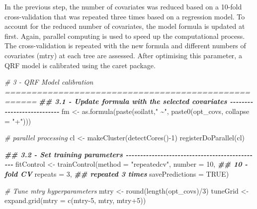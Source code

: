 \documentclass[
  10pt,
  b5paper,
  oneside]{book}
\newenvironment{Shaded}{\begin{snugshade}}{\end{snugshade}}
\newcommand{\AttributeTok}[1]{\textcolor[rgb]{0.77,0.63,0.00}{#1}}
\newcommand{\CommentTok}[1]{\textcolor[rgb]{0.56,0.35,0.01}{\textit{#1}}}
\newcommand{\ConstantTok}[1]{\textcolor[rgb]{0.00,0.00,0.00}{#1}}
\newcommand{\DecValTok}[1]{\textcolor[rgb]{0.00,0.00,0.81}{#1}}
\newcommand{\DocumentationTok}[1]{\textcolor[rgb]{0.56,0.35,0.01}{\textbf{\textit{#1}}}}
\newcommand{\FunctionTok}[1]{\textcolor[rgb]{0.00,0.00,0.00}{#1}}
\newcommand{\NormalTok}[1]{#1}
\newcommand{\OtherTok}[1]{\textcolor[rgb]{0.56,0.35,0.01}{#1}}
\newcommand{\SpecialCharTok}[1]{\textcolor[rgb]{0.00,0.00,0.00}{#1}}
\newcommand{\StringTok}[1]{\textcolor[rgb]{0.31,0.60,0.02}{#1}}
\begin{document}
In the previous step, the number of covariates was reduced based on a 10-fold cross-validation that was repeated three times based on a regression model. To account for the reduced number of covariates, the model formula is updated at first.
Again, parallel computing is used to speed up the computational process.
The cross-validation is repeated with the new formula and different numbers of covariates (mtry) at each tree are assessed. After optimising this parameter, a QRF model is calibrated using the caret package.

\begin{Shaded}
\begin{Highlighting}[]
\CommentTok{\# 3 {-} QRF Model calibration ====================================================}
\DocumentationTok{\#\# 3.1 {-} Update formula with the selected covariates {-}{-}{-}{-}{-}{-}{-}{-}{-}{-}{-}{-}{-}{-}{-}{-}{-}{-}{-}{-}{-}{-}{-}{-}{-}{-}{-}}
\NormalTok{fm }\OtherTok{\textless{}{-}} \FunctionTok{as.formula}\NormalTok{(}\FunctionTok{paste}\NormalTok{(soilatt,}\StringTok{" \textasciitilde{}"}\NormalTok{, }\FunctionTok{paste0}\NormalTok{(opt\_covs, }\AttributeTok{collapse =} \StringTok{"+"}\NormalTok{)))}

\CommentTok{\# parallel processing}
\NormalTok{cl }\OtherTok{\textless{}{-}} \FunctionTok{makeCluster}\NormalTok{(}\FunctionTok{detectCores}\NormalTok{()}\SpecialCharTok{{-}}\DecValTok{1}\NormalTok{)}
\FunctionTok{registerDoParallel}\NormalTok{(cl)}

\DocumentationTok{\#\# 3.2 {-} Set training parameters {-}{-}{-}{-}{-}{-}{-}{-}{-}{-}{-}{-}{-}{-}{-}{-}{-}{-}{-}{-}{-}{-}{-}{-}{-}{-}{-}{-}{-}{-}{-}{-}{-}{-}{-}{-}{-}{-}{-}{-}{-}{-}{-}{-}{-}{-}{-}}
\NormalTok{fitControl }\OtherTok{\textless{}{-}} \FunctionTok{trainControl}\NormalTok{(}\AttributeTok{method =} \StringTok{"repeatedcv"}\NormalTok{,}
                           \AttributeTok{number =} \DecValTok{10}\NormalTok{,         }\DocumentationTok{\#\# 10 {-}fold CV}
                           \AttributeTok{repeats =} \DecValTok{3}\NormalTok{,        }\DocumentationTok{\#\# repeated 3 times}
                           \AttributeTok{savePredictions =} \ConstantTok{TRUE}\NormalTok{)}

\CommentTok{\# Tune mtry hyperparameters}
\NormalTok{mtry }\OtherTok{\textless{}{-}} \FunctionTok{round}\NormalTok{(}\FunctionTok{length}\NormalTok{(opt\_covs)}\SpecialCharTok{/}\DecValTok{3}\NormalTok{)}
\NormalTok{tuneGrid }\OtherTok{\textless{}{-}}  \FunctionTok{expand.grid}\NormalTok{(}\AttributeTok{mtry =} \FunctionTok{c}\NormalTok{(mtry}\DecValTok{{-}5}\NormalTok{, mtry, mtry}\SpecialCharTok{+}\DecValTok{5}\NormalTok{))}


\end{Highlighting}
\end{Shaded}
\end{document}
